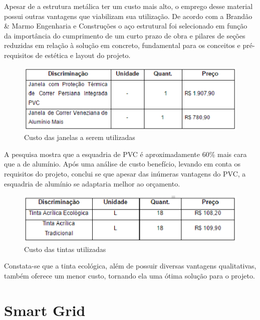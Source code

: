 Apesar de a estrutura metálica ter um custo mais alto, o emprego desse material possui outras vantagens que viabilizam sua utilização. De acordo com a Brandão \& Marmo Engenharia e Construções o aço estrutural foi selecionado em função da importância do cumprimento de um curto prazo de obra e pilares de seções reduzidas em relação à solução em concreto, fundamental para os conceitos e pré-requisitos de estética e layout do projeto.

\begin{figure}[!h]
\centering
\includegraphics[keepaspectratio=true,scale=1]{figuras/precojanelas.eps}
\caption{Custo das janelas a serem utilizadas}
\end{figure}

A pesquisa mostra que a esquadria de PVC é aproximadamente 60\% mais cara que a de alumínio. Após uma análise de custo benefício, levando em conta os requisitos do projeto, conclui se que apesar das inúmeras vantagens do PVC, a esquadria de alumínio se adaptaria melhor ao orçamento.

\begin{figure}[!h]
\centering
\includegraphics[scale=1]{figuras/custotintas.eps}
\caption{Custo das tintas utilizadas}
\end{figure}
\indent

Constata-se que a tinta ecológica, além de possuir diversas vantagens qualitativas, também oferece um menor custo, tornando ela uma ótima solução para o projeto.








\chapter[Smart Grid]{Smart Grid}

